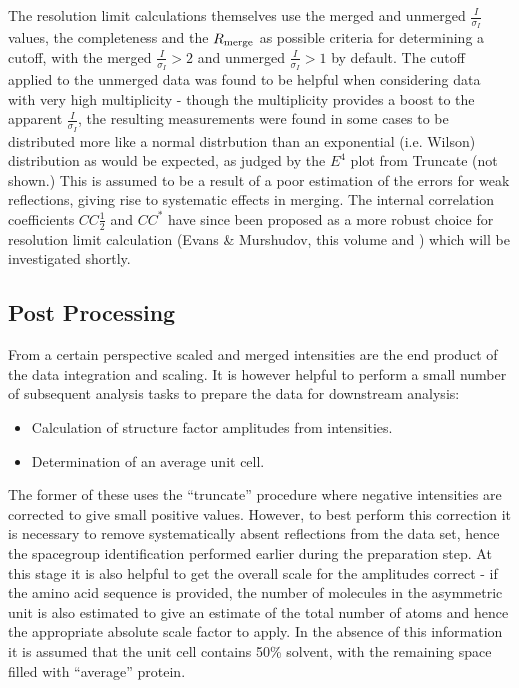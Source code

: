 \documentclass[preprint,pdf]{iucr}
\begin{document}
The resolution limit calculations themselves use the merged and
unmerged $\frac{I}{\sigma_I}$ values, the completeness and the
$R_{\rm{merge}}$ as possible criteria for determining a cutoff, with
the merged $\frac{I}{\sigma_I} > 2$ and unmerged 
$\frac{I}{\sigma_I}> 1$ by default. The cutoff applied to the unmerged
data was found to be 
helpful when considering data with very high multiplicity - though the
multiplicity provides a boost to the apparent $\frac{I}{\sigma_I}$,
the resulting measurements were found in some cases
to be distributed more like a
normal distrbution than an exponential (i.e. Wilson) distribution as
would be
expected, as judged by the $E^4$ plot from Truncate (not shown.)
This is assumed
to be a result of a poor estimation of the errors for weak
reflections, giving rise to systematic effects in
merging. The internal correlation coefficients $CC\frac{1}{2}$ and $CC^*$
have since been proposed as a more robust
choice for resolution limit calculation (Evans \& Murshudov, this
volume and \cite{Karplus25052012})
which will be investigated shortly.

\subsection{Post Processing}

From a certain perspective scaled and merged intensities are the end
product of the data integration and scaling. It is however helpful to
perform a small number of subsequent analysis tasks to prepare the
data for downstream analysis:

\begin{itemize}
\item{Calculation of structure factor amplitudes from intensities.}
\item{Determination of an average unit cell.}
\end{itemize}

\noindent
The former of these uses the ``truncate'' procedure \cite{French:a15572}
where negative intensities are corrected to give small positive
values. However, to best perform this correction it is necessary to
remove systematically absent reflections from the data set, hence the
spacegroup identification performed earlier during the preparation
step. At this stage it is also helpful to get the overall scale for
the amplitudes correct - if the amino acid sequence is provided, the
number of molecules in the asymmetric unit is also
estimated \cite{KantardjieffRupp}
to give an estimate of the total number of atoms
and hence the appropriate absolute
scale factor to apply. In the absence of
this information it is assumed that the unit cell contains 50\%
solvent, with the remaining space filled with ``average'' protein. 
\end{document}
